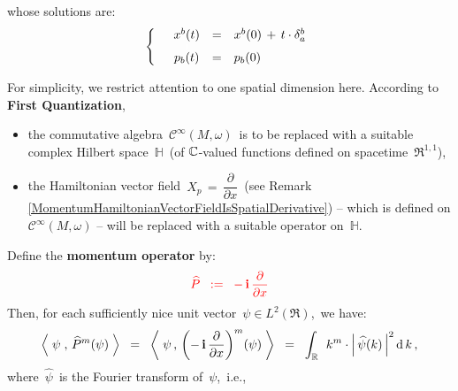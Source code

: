 \begin{remark}
whose solutions are:
\begin{equation*}
\left\{\quad
\begin{array}{ccl}
x^{b}(t)
& = &
	x^{b}(0)
	\,+\,
	t\cdot\delta^{b}_{a}
\\
\overset{{\color{white}1}}{p_{b}(t)}
& = &
	p_{b}(0)
\end{array}
\right.
\end{equation*}
\end{remark}

\vskip 0.5cm
\begin{remark}
\mbox{}
\vskip 0.05cm
\noindent
For simplicity, we restrict attention to one spatial dimension here.
According to \textbf{First Quantization},
\begin{itemize}
\item
	the commutative algebra
	\,$\mathscr{C}^{\infty}(M,\omega)$\,
	is to be replaced with a suitable complex Hilbert space \,$\mathbb{H}$\,
	(of $\mathbb{C}$-valued functions defined on spacetime \,$\Re^{1,1}$),
\item
	the Hamiltonian vector field
	\,{\color{red}$X_{p} \,=\, \dfrac{\partial}{\partial x}$}\,
	(see Remark \ref{MomentumHamiltonianVectorFieldIsSpatialDerivative})
	-- which is defined on $\mathscr{C}^{\infty}(M,\omega)$ --
	will be replaced with a suitable operator on \,$\mathbb{H}$.\,
\end{itemize}
Define the \textbf{momentum operator} by:
\begin{equation*}
{\color{red}
\widehat{P}
\;\; := \;\;
	-\,\mathbf{i}\,\dfrac{\partial}{\partial x}
}
\end{equation*}
Then, for each sufficiently nice unit vector \,$\psi \in L^{2}(\Re)$,\,
we have:
\begin{equation*}
\left\langle\;
	\overset{{\color{white}.}}{\psi}
	\;,\,
	\widehat{P}^{m}(\psi)
	\;\right\rangle
\;\; = \;\;
\left\langle\;
	\psi
	\,,\,
	\left(-\,\i\,\dfrac{\partial}{\partial x}\right)^{m}\!(\psi)
	\;\right\rangle
\;\; = \;\;
	\int_{\Re}\;\,
		k^{m}\cdot\left\vert\,\widehat{\psi}(k)\,\right\vert^{2}
		\d\,k\,,
\end{equation*}
where \,$\widehat{\psi}$\, is the Fourier transform of \,$\psi$,\, i.e.,\,

\end{remark}
